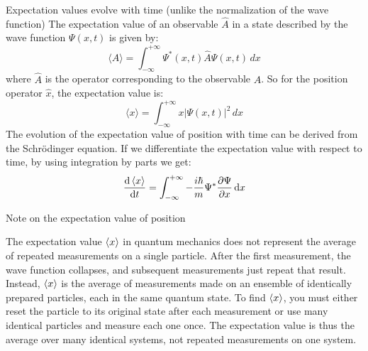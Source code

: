 \begin{frame}{Expectation values evolve with time (unlike the normalization of the wave function)}
	The expectation value of an observable $\hat{A}$ in a state described by the wave function $\Psi(x, t)$ is given by:
	\begin{equation*}
		\langle A \rangle = \int_{-\infty}^{+\infty} \Psi^*(x, t) \hat{A} \Psi(x, t) \, dx
	\end{equation*}
	where $\hat{A}$ is the operator corresponding to the observable $A$.
	So for the position operator $\hat{x}$, the expectation value is:
	\begin{equation*}
		\langle x \rangle = \int_{-\infty}^{+\infty} x |\Psi(x, t)|^2 \, dx
	\end{equation*}
	The evolution of the expectation value of position with time can be derived from the Schrödinger equation. If we differentiate the expectation value with respect to time, by using integration by parts we get:
	\begin{equation*}
		\dv{\ev{x}}{t} = \int_{-\infty}^{+\infty} -\frac{i\hbar}{m} \Psi^* \pdv{\Psi}{x} \dd{x}
	\end{equation*}

\end{frame}

\begin{frame}{Note on the expectation value of position}

	The expectation value $\ev{x}$ in quantum mechanics does not represent the average of repeated measurements on a single particle. After the first measurement, the wave function collapses, and subsequent measurements just repeat that result. Instead, $\ev{x}$ is the average of measurements made on an ensemble of identically prepared particles, each in the same quantum state.
	To find $\ev{x}$, you must either reset the particle to its original state after each measurement or use many identical particles and measure each one once. The expectation value is thus the average over many identical systems, not repeated measurements on one system.

\end{frame}

